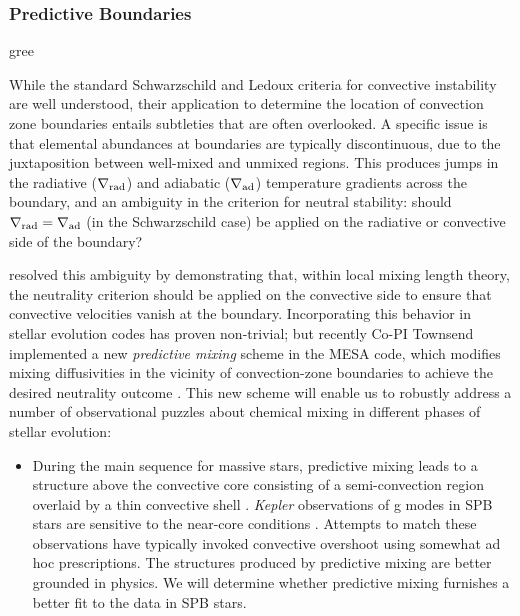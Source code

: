 \subsubsection{Predictive Boundaries}

{\color gree

While the standard Schwarzschild and Ledoux criteria for convective instability are well understood, their application to determine the location of convection zone boundaries entails subtleties that are often overlooked. A specific issue is that elemental abundances at boundaries are typically discontinuous, due to the juxtaposition between well-mixed and unmixed regions. This produces jumps in the radiative ($\nabla_{\rm rad}$) and adiabatic ($\nabla_{\rm ad}$) temperature gradients across the boundary, and an ambiguity in the criterion for neutral stability: should $\nabla_{\rm rad}=\nabla_{\rm ad}$ (in the Schwarzschild case) be applied on the radiative or convective side of the boundary?

\citet{Gabriel:2014} resolved this ambiguity by demonstrating that, within local mixing length theory, the neutrality criterion should be applied on the convective side to ensure that convective velocities vanish at the boundary. Incorporating this behavior in stellar evolution codes has proven non-trivial; but recently Co-PI Townsend implemented a new \emph{predictive mixing} scheme in the MESA code, which modifies mixing diffusivities in the vicinity of convection-zone boundaries to achieve the desired neutrality outcome \citep[see][]{Paxton:2017}. This new scheme will enable us to robustly address a number of observational puzzles about chemical mixing in different phases of stellar evolution:
\begin{itemize}

\item During the main sequence for massive stars, predictive mixing leads to a structure above the convective core consisting of a semi-convection region overlaid by a thin convective shell \citep[see, e.g., the right-hand panel in Fig.~4 of][]{Paxton:2017}. \emph{Kepler} observations of g modes in SPB stars are sensitive to the near-core conditions \citep[e.g.,][]{Moravveji:2015}.  Attempts to match these observations have typically invoked convective overshoot using somewhat ad hoc prescriptions. The structures produced by predictive mixing are better grounded in physics. We will determine whether predictive mixing furnishes a better fit to the data in SPB stars.


\end{itemize}}
